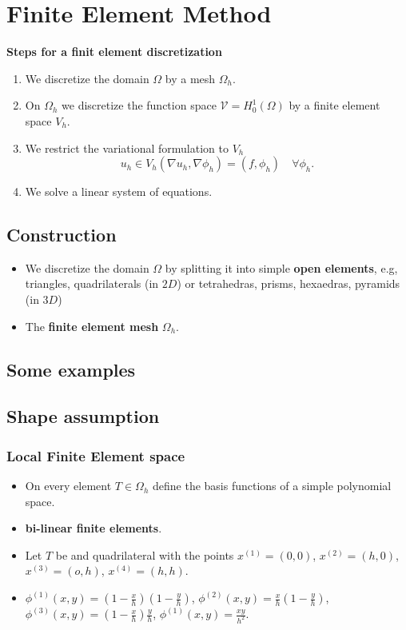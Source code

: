 \documentclass[
	a4paper,
	11pt,
	oneside
]{scrreprt}
\theoremstyle{definition}
\begin{document}
\chapter{Finite Element Method}

\textbf{Steps for a finit element discretization}

\begin{enumerate}
	\item We discretize the domain $\Omega$ by a mesh $\Omega_{h}$.
	\item On $\Omega_{h}$ we discretize the function space $\mathcal{V}=H^{1}_{0}\left(\Omega\right)$ by a finite element space $V_{h}$.
	\item We restrict the variational formulation to $V_{h}$ \[u_{h}\in V_{h} \left(\nabla u_{h},\nabla \phi_{h}\right)=\left(f,\phi_{h}\right)\quad\forall \phi_{h}. \]
	\item We solve a linear system of equations.
\end{enumerate}

\section{Construction}

\begin{itemize}
	\item We discretize the domain $\Omega$ by splitting it into simple \textbf{open elements}, e.g, triangles, quadrilaterals (in $2D$) or tetrahedras, prisms, hexaedras, pyramids (in $3D$)
	\item The \textbf{finite element mesh} $\Omega_{h}$.
\end{itemize}

\section{Some examples}

\section{Shape assumption}

\subsection{Local Finite Element space}

\begin{itemize}
	\item On every element $T\in\Omega_{h}$ define the basis functions of a simple polynomial space.
	\item \textbf{bi-linear finite elements}.
	\item Let $T$ be and quadrilateral with the points $x^{(1)}=\left(0,0\right)$, $x^{(2)}=\left(h,0\right)$, $x^{(3)}=\left(o,h\right)$, $x^{(4)}=\left(h,h\right)$.
	\item $\phi^{(1)}\left(x,y\right)=\left(1-\frac{x}{h}\right)\left(1-\frac{y}{h}\right)$, $\phi^{(2)}\left(x,y\right)=\frac{x}{h}\left(1-\frac{y}{h}\right)$, $\phi^{(3)}\left(x,y\right)=\left(1-\frac{x}{h}\right)\frac{y}{h}$, $\phi^{(1)}\left(x,y\right)=\frac{xy}{h^{2}}$.
\end{itemize}
\end{document}
